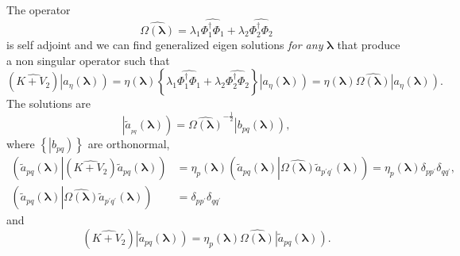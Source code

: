 \documentclass[aps,preprint]{revtex4}%
\begin{document}
The operator
\begin{equation}
\widehat{\Omega\left(  \mathbf{\lambda}\right)  }=\lambda_{1}\widehat{\Phi
_{1}^{\dagger}\Phi_{1}}+\lambda_{2}\widehat{\Phi_{2}^{\dagger}\Phi_{2}}%
\end{equation}
is self adjoint and we can find generalized eigen solutions \emph{for any}
$\mathbf{\lambda}$ that produce a non singular operator such that
\begin{equation}
\left(  \widehat{K+V_{2}}\right)  \left\vert \overset{}{a_{\eta}}\left(
\mathbf{\lambda}\right)  \right)  =\eta\left(  \mathbf{\lambda}\right)
\left\{  \lambda_{1}\widehat{\Phi_{1}^{\dagger}\Phi_{1}}+\lambda_{2}%
\widehat{\Phi_{2}^{\dagger}\Phi_{2}}\right\}  \left\vert \overset{}{a_{\eta}%
}\left(  \mathbf{\lambda}\right)  \right)  =\eta\left(  \mathbf{\lambda
}\right)  \widehat{\Omega\left(  \mathbf{\lambda}\right)  }\left\vert
\overset{}{a_{\eta}}\left(  \mathbf{\lambda}\right)  \right)  .
\end{equation}
The solutions are
\begin{equation}
\left\vert \overset{}{\tilde{a}_{_{pq}}}\left(  \mathbf{\lambda}\right)
\right)  =\widehat{\Omega\left(  \mathbf{\lambda}\right)  }^{-\frac{1}{2}%
}\left\vert \overset{}{b_{pq}}\left(  \mathbf{\lambda}\right)  \right)  ,
\end{equation}
where $\left\{  \left\vert \overset{}{b_{pq}}\right)  \right\}  $ are
orthonormal,
\begin{align}
\left(  \tilde{a}_{pq}\left(  \mathbf{\lambda}\right)  \left\vert \left(
\widehat{K+V_{2}}\right)  \tilde{a}_{pq}\left(  \mathbf{\lambda}\right)
\right.  \right)   &  =\eta_{p}\left(  \mathbf{\lambda}\right)  \left(
\tilde{a}_{pq}\left(  \mathbf{\lambda}\right)  \left\vert \widehat
{\Omega\left(  \mathbf{\lambda}\right)  }\tilde{a}_{p^{\prime}q^{\prime}%
}\left(  \mathbf{\lambda}\right)  \right.  \right)  =\eta_{p}\left(
\mathbf{\lambda}\right)  \delta_{pp^{\prime}}\delta_{qq^{\prime}},\\
\left(  \tilde{a}_{pq}\left(  \mathbf{\lambda}\right)  \left\vert
\widehat{\Omega\left(  \mathbf{\lambda}\right)  }\tilde{a}_{p^{\prime
}q^{\prime}}\left(  \mathbf{\lambda}\right)  \right.  \right)   &
=\delta_{pp^{\prime}}\delta_{qq^{\prime}}%
\end{align}
and
\begin{equation}
\left(  \widehat{K+V_{2}}\right)  \left\vert \overset{}{\tilde{a}_{pq}}\left(
\mathbf{\lambda}\right)  \right)  =\eta_{p}\left(  \mathbf{\lambda}\right)
\widehat{\Omega\left(  \mathbf{\lambda}\right)  }\left\vert \overset{}%
{\tilde{a}_{pq}}\left(  \mathbf{\lambda}\right)  \right)  .
\end{equation}
\end{document}
